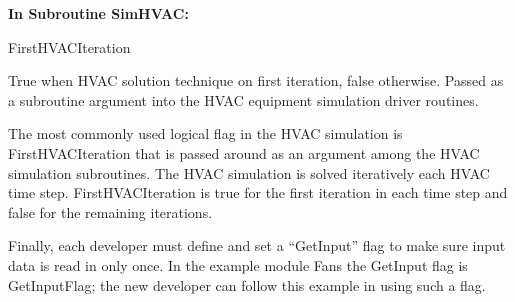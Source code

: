 \textbf{In Subroutine SimHVAC:}

FirstHVACIteration

True when HVAC solution technique on first iteration, false otherwise. Passed as a subroutine argument into the HVAC equipment simulation driver routines.

The most commonly used logical flag in the HVAC simulation is FirstHVACIteration that is passed around as an argument among the HVAC simulation subroutines. The HVAC simulation is solved iteratively each HVAC time step. FirstHVACIteration is true for the first iteration in each time step and false for the remaining iterations.

Finally, each developer must define and set a ``GetInput'' flag to make sure input data is read in only once. In the example module Fans the GetInput flag is GetInputFlag; the new developer can follow this example in using such a flag.
